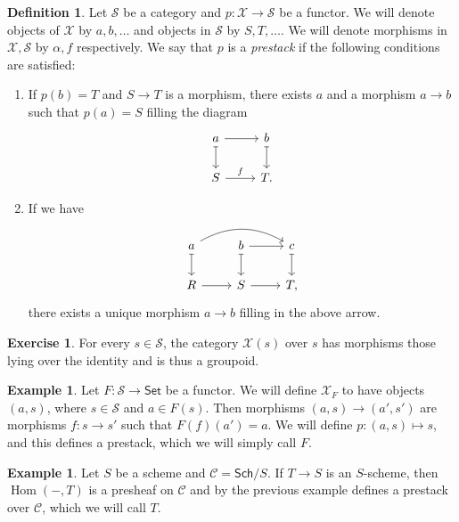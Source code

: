 \documentclass[leqno, openany]{memoir}
\theoremstyle{definition}
\newtheorem{defn}[thm]{Definition}
\newtheorem{exm}[thm]{Example}
\newtheorem{exer}[thm]{Exercise}
\theoremstyle{remark}
\theoremstyle{plain}
\theoremstyle{definition}
\theoremstyle{remark}
\newcommand{\mc}[1]{\mathcal{#1}}
\newcommand{\ms}[1]{\mathsf{#1}}
\DeclareMathOperator{\Hom}{Hom}
\begin{document}
\begin{defn}
    Let $\mc{S}$ be a category and $p \colon \mc{X} \to \mc{S}$ be a functor. We will denote objects of $\mc{X}$ by $a,b,\ldots$ and objects in $\mc{S}$ by $S,T,\ldots$. We will denote morphisms in $\mc{X}, \mc{S}$ by $\alpha, f$ respectively. We say that $p$ is a \textit{prestack} if the following conditions are satisfied:
    \begin{enumerate}
        \item If $p(b) = T$ and $S \to T$ is a morphism, there exists $a$ and a morphism $a \to b$ such that $p(a) = S$ filling the diagram
            \begin{equation*}
            \begin{tikzcd}
                a \ar{r} \ar[mapsto]{d} & b \ar[mapsto]{d} \\
                S \ar{r}{f} & T.
            \end{tikzcd}
            \end{equation*}
        \item If we have
            \begin{equation*}
            \begin{tikzcd}
                a \ar[mapsto]{d} \ar[bend left=30]{rr} & b \ar[mapsto]{d} \ar{r} & c \ar[mapsto]{d} \\
                R \ar{r} & S \ar{r} & T,
            \end{tikzcd}
            \end{equation*}
            there exists a unique morphism $a \to b$ filling in the above arrow.
    \end{enumerate}
\end{defn}

\begin{exer}
    For every $s \in \mc{S}$, the category $\mc{X}(s)$ over $s$ has morphisms those lying over the identity and is thus a groupoid.
\end{exer}

\begin{exm}
    Let $F \colon \mc{S} \to \ms{Set}$ be a functor. We will define $\mc{X}_F$ to have objects $(a,s)$, where $s \in \mc{S}$ and $a \in F(s)$. Then morphisms $(a,s) \to (a', s')$ are morphisms $f \colon s \to s'$ such that $F(f)(a') = a$. We will define $p \colon (a,s) \mapsto s$, and this defines a prestack, which we will simply call $F$.
\end{exm}

\begin{exm}
    Let $S$ be a scheme and $\mc{C} = \ms{Sch}/S$. If $T \to S$ is an $S$-scheme, then $\Hom(-, T)$ is a presheaf on $\mc{C}$ and by the previous example defines a prestack over $\mc{C}$, which we will call $T$.
\end{exm}
\end{document}
